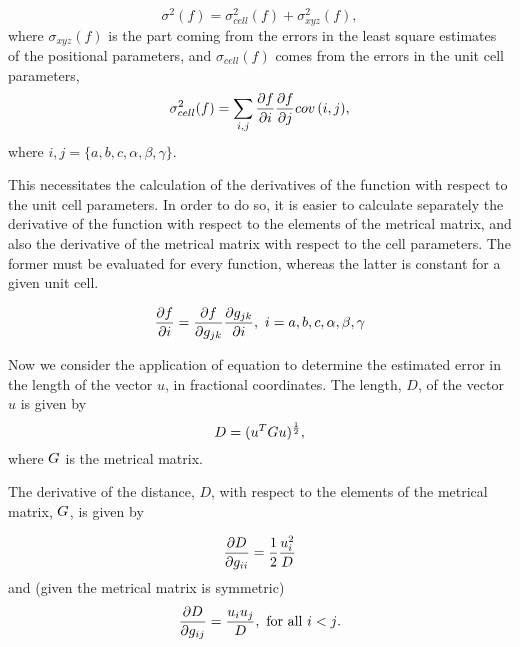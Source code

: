 \documentclass[pdf]{iucr}
\begin{document}
\begin{equation}
\sigma^2(f) = \sigma^2_{cell}(f) + \sigma^2_{xyz}(f)
\label{eqn:sigma_d},
\end{equation}
where $\sigma_{xyz}(f)$ is the part coming from the errors in the least square estimates of the positional parameters, and $\sigma_{cell}(f)$ comes from the errors in the unit cell parameters,
\begin{equation}
\sigma^2_{cell}(f) = \sum_{i,j}{{\frac{\partial f}{\partial i}\frac{\partial f}{\partial j} cov\left(i,j\right)}}
\label{eqn:sigma_cell},
\end{equation}
where $i,j=\lbrace{a,b,c,\alpha,\beta,\gamma\rbrace}$.

This necessitates the calculation of the derivatives of the function with respect to the unit cell parameters. In order to do so, it is easier to calculate separately the derivative of the function with respect to the elements of the metrical matrix, and also the derivative of the metrical matrix with respect to the cell parameters. The former must be evaluated for every function, whereas the latter is constant for a given unit cell.

\begin{equation}
\frac{\partial f}{\partial i} = \frac{\partial f}{\partial g_{jk}}\frac{\partial g_{jk}}{\partial i},\ i=a, b, c, \alpha, \beta, \gamma
\label{eqn:df_dcell}
\end{equation}

Now we consider the application of equation  to determine the estimated error in the length of the vector $u$, in fractional coordinates. The length, $D$, of the  vector $u$ is given by
\begin{equation}
D = (u^T G u)^\frac{1}{2}
\label{eqn:bond_length},
\end{equation}
where $G$ is the metrical matrix.

The derivative of the distance, $D$, with respect to the elements of the metrical matrix, $G$, is given by
%

\begin{equation}
\frac{\partial D}{\partial g_{ii}} = \frac{1}{2} \frac{u_i^2}{D}
\label{eqn:d_distance_d_gii}
\end{equation}
and (given the metrical matrix is symmetric)
\begin{equation}
\frac{\partial D}{\partial g_{ij}} = \frac{u_i u_j}{D},\ \text{for all $i<j$}.
\label{eqn:d_distance_d_gij}
\end{equation}
\end{document}
